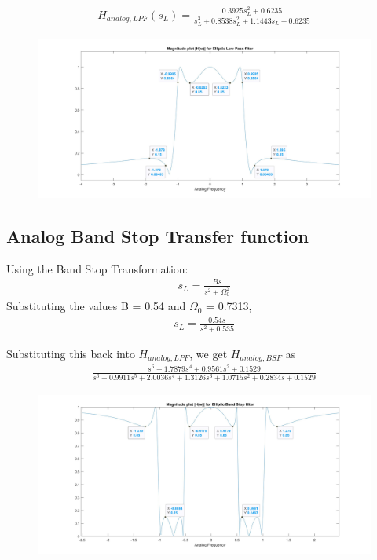 \documentclass[12pt]{article}
\begin{document}
\begin{gather*}
	H_{analog,LPF}(s_{L}) = \frac{0.3925s_L^2 + 0.6235}{s_L^3 + 0.8538s_L^2 + 1.1443s_L + 0.6235}	
\end{gather*}

\begin{figure}[H]
	\centering
	\includegraphics[width = 18cm]{Filter4ALPF.jpg}
\end{figure}

\color{cyan}
\subsection{Analog Band Stop Transfer function}
\color{black}
Using the Band Stop Transformation:
\begin{gather*}
	s_L = \frac{Bs}{s^2 + \Omega_0^2}
\end{gather*}
Substituting the values B = 0.54 and $\Omega_0$ = 0.7313,
\begin{gather*}
	s_L = \frac{0.54s}{s^2 + 0.535}
\end{gather*}

\noindent Substituting this back into $H_{analog,LPF}$, we get $H_{analog,BSF}$ as
\begin{gather*}
	\frac{s^6 + 1.7879s^4 +0.9561s^2 + 0.1529}{s^6 + 0.9911s^5 + 2.0036s^4 + 1.3126s^3 + 1.0715s^2 + 0.2834s + 0.1529}	
\end{gather*}
\begin{figure}[H]
	\centering
	\includegraphics[width = 16cm, trim=1cm 0cm 1cm 0cm, clip]{Filter4ABSF.jpg}
\end{figure}
\end{document}
